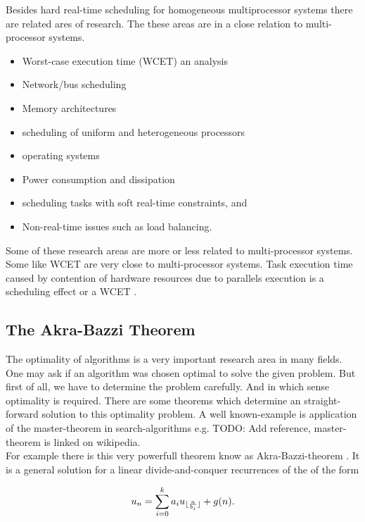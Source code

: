 		Besides hard real-time scheduling for homogeneous multiprocessor systems there are related ares of research. The these areas are in a  close relation to multi-processor systems.
		\begin{itemize}
		\item Worst-case execution time (WCET) an analysis
		\item Network/bus scheduling
		\item Memory architectures
		\item scheduling of uniform and heterogeneous processors
		\item operating systems
		\item Power consumption and dissipation
		\item scheduling tasks with soft real-time constraints, and
		\item Non-real-time issues such as load balancing.
		\end{itemize}
		Some of these research areas are more or less related to multi-processor systems. Some like WCET are very close to multi-processor systems.
		Task execution time caused by contention of hardware resources due to parallels execution is a scheduling effect or a WCET \cite[Sec. 10.2]{DB2011}.
		
 
\subsection{The Akra-Bazzi Theorem}
\label{subsection:The Akra-Bazzi Theorem}

	The optimality of algorithms is a very important research area in many fields.
	One may ask if an algorithm was chosen optimal to solve the given problem.
	But first of all, we have to determine the problem carefully. And in which sense optimality is required. There are some theorems which determine an straight-forward solution to this optimality problem. A well known-example is application of the master-theorem in search-algorithms e.g. \cite {}TODO: Add reference, master-theorem is linked on wikipedia.\\
	For example there is this very powerfull theorem know as Akra-Bazzi-theorem \cite{AB98}.
	It is a general solution for a linear divide-and-conquer recurrences of the of the form

	\begin{equation}
		\label{eq:linearDevideAndConquerRecurrence}
		 u_n = \sum_{i=0}^k a_i u _{\lfloor\frac{n}{b_i}\rfloor} + g(n).
	\end{equation}
 
